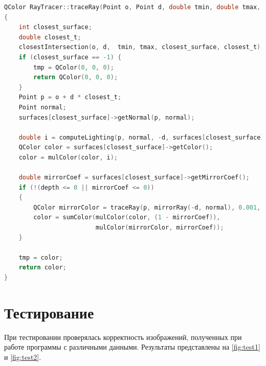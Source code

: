 \documentclass[12pt]{report}
\begin{document}
\newpage
\begin{lstlisting}[label=base_code,caption=Алгоритм трассировки лучей, language=C]
QColor RayTracer::traceRay(Point o, Point d, double tmin, double tmax, int depth, QColor &tmp)
{
    int closest_surface;
    double closest_t;
    closestIntersection(o, d,  tmin, tmax, closest_surface, closest_t);
    if (closest_surface == -1) {
        tmp = QColor(0, 0, 0);
        return QColor(0, 0, 0);
    }
    Point p = o + d * closest_t;
    Point normal;
    surfaces[closest_surface]->getNormal(p, normal);

    double i = computeLighting(p, normal, -d, surfaces[closest_surface]->getShineCoef());
    QColor color = surfaces[closest_surface]->getColor();
    color = mulColor(color, i);

    double mirrorCoef = surfaces[closest_surface]->getMirrorCoef();
    if (!(depth <= 0 || mirrorCoef <= 0))
    {
        QColor mirrorColor = traceRay(p, mirrorRay(-d, normal), 0.001, INT_MAX, depth - 1, tmp);
        color = sumColor(mulColor(color, (1 - mirrorCoef)),
                         mulColor(mirrorColor, mirrorCoef));
    }

    tmp = color;
    return color;
}
\end{lstlisting}

\section{Тестирование}

При тестировании проверялась корректность изображений, полученных при работе программы с различными данными. Результаты представлены на \ref{fig:test1} и \ref{fig:test2}.
\end{document}
